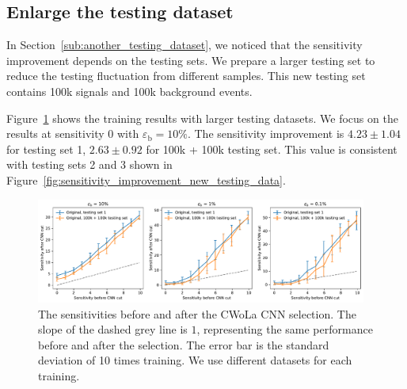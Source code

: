 \documentclass[12pt]{article}
\begin{document}
    \subsection{Enlarge the testing dataset}%
    \label{sub:enlarge_the_testing_dataset}
        In Section~\ref{sub:another_testing_dataset}, we noticed that the sensitivity improvement depends on the testing sets. We prepare a larger testing set to reduce the testing fluctuation from different samples. This new testing set contains 100k signals and 100k background events.

        Figure~\ref{fig:sensitivity_improvement_larger_testing_data} shows the training results with larger testing datasets. We focus on the results at sensitivity 0 with $\varepsilon_{\text{b}} = 10\%$. The sensitivity improvement is $4.23 \pm 1.04$ for testing set 1, $2.63 \pm 0.92$ for 100k + 100k testing set. This value is consistent with testing sets 2 and 3 shown in Figure~\ref{fig:sensitivity_improvement_new_testing_data}.
        \begin{figure}[htpb]
            \centering
			\includegraphics[width=0.97\textwidth]{HVmodel_sensitivity_improvement_origin_bkg_subtraction_larger_testing_set.pdf}
            \caption{The sensitivities before and after the CWoLa CNN selection. The slope of the dashed grey line is $1$, representing the same performance before and after the selection. The error bar is the standard deviation of 10 times training. We use different datasets for each training.}
            \label{fig:sensitivity_improvement_larger_testing_data}
        \end{figure}
\end{document}

